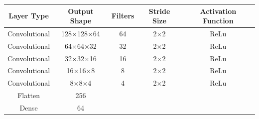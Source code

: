 \documentclass[12pt, onecolumn]{article}
\begin{document}


            


        \begin{table}[H]
            \centering

            \begin{tabular}{|c c c c c|}


                \hline
                
                Layer Type & Output Shape & Filters & Stride Size & Activation Function  \\
    
                \hline
                
                Convolutional & 128$\times$128$\times$64 & 64 & 2$\times$2 & ReLu \\
    
                Convolutional & 64$\times$64$\times$32 & 32 & 2$\times$2 & ReLu \\
    
                Convolutional & 32$\times$32$\times$16 & 16 & 2$\times$2 & ReLu \\
    
                Convolutional & 16$\times$16$\times$8 & 8 & 2$\times$2 & ReLu \\
    
                Convolutional & 8$\times$8$\times$4 & 4 & 2$\times$2 & ReLu \\
    
                Flatten & 256 & & & \\

                Dense & 64 & & & \\
                

\end{tabular}
\end{table}
\end{document}
